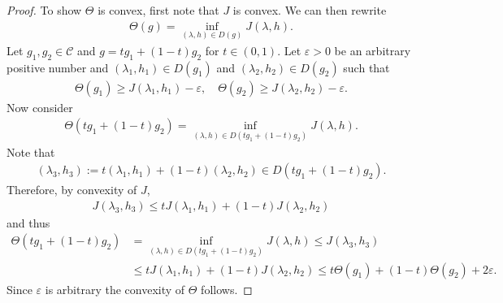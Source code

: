 \documentclass{article}
\theoremstyle{definition}
\theoremstyle{remarksty}
\begin{document}
\begin{proof}
    To show $\Theta$ is convex, first note that $J$ is convex. We can then rewrite 
\begin{align*}
    \Theta(g) = \inf_{(\lambda, h) \in D(g)} J(\lambda, h).
\end{align*}
Let $g_1,g_2 \in \mathcal{C}$ and $g = tg_1 + (1-t)g_2$ for $t \in (0,1)$. Let $\varepsilon >0$ be an arbitrary positive number and
$(\lambda_1, h_1) \in D(g_1)$ and $(\lambda_2, h_2) \in D(g_2)$ such that
\begin{align*}
    \Theta(g_1) \geq J(\lambda_1, h_1) - \varepsilon, \quad
    \Theta(g_2) \geq  J(\lambda_2, h_2) - \varepsilon.
\end{align*}
Now consider 
\begin{align*}
    \Theta(tg_1 + (1-t)g_2) = \inf_{(\lambda, h) \in D(tg_1 + (1-t)g_2)} J(\lambda, h).
\end{align*}
Note that
\begin{align*}
    (\lambda_3, h_3) := t(\lambda_1, h_1) + (1-t)(\lambda_2, h_2) \in D(tg_1 + (1-t)g_2).
\end{align*}
Therefore, by convexity of $J$,
\begin{align*}
    J(\lambda_3, h_3) \leq t J(\lambda_1, h_1) + (1-t)J(\lambda_2, h_2)
\end{align*}
and thus
\begin{align*}
    \Theta(tg_1 + (1-t)g_2) &= \inf_{(\lambda, h) \in D(tg_1 + (1-t)g_2)} J(\lambda, h)
    \leq J(\lambda_3, h_3) \\
     & \leq t J(\lambda_1, h_1) + (1-t)J(\lambda_2, h_2) 
     \leq t \Theta(g_1) + (1-t) \Theta(g_2) + 2\varepsilon.
\end{align*}
Since $\varepsilon$ is arbitrary the convexity of $\Theta$ follows.
\end{proof}
\end{document}
